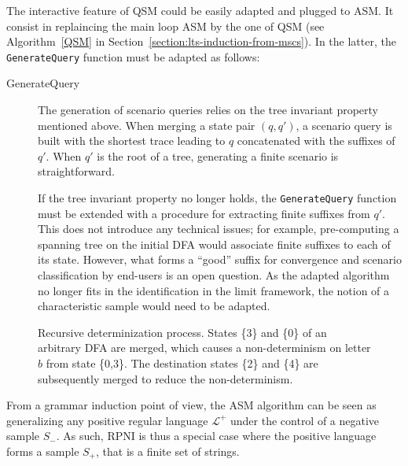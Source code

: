 The interactive feature of QSM could be easily adapted and plugged to ASM. It consist in replaincing the main loop ASM by the one of QSM (see Algorithm~\ref{QSM} in Section~\ref{section:lts-induction-from-mscs}). In the latter, the \texttt{GenerateQuery} function must be adapted as follows:

\begin{description}

\item[GenerateQuery] The generation of scenario queries relies on the tree invariant property mentioned above. When merging a state pair $(q,q')$, a scenario query is built with the shortest trace leading to $q$ concatenated with the suffixes of $q'$. When $q'$ is the root of a tree, generating a finite scenario is straightforward.

If the tree invariant property no longer holds, the \texttt{GenerateQuery} function must be extended with a procedure for extracting finite suffixes from $q'$. This does not introduce any technical issues; for example, pre-computing a spanning tree on the initial DFA would associate finite suffixes to each of its state. However, what forms a ``good'' suffix for convergence and scenario classification by end-users is an open question. As the adapted algorithm no longer fits in the identification in the limit framework, the notion of a characteristic sample would need to be adapted. 

\end{description}

\begin{figure}\centering
{}
\caption{Recursive determinization process. States \{3\} and \{0\} of an arbitrary DFA are merged, which causes a non-determinism on letter $b$ from state \{0,3\}. The destination states \{2\} and \{4\} are subsequently merged to reduce the non-determinism.\label{figure:merging-for-determ-on-dfa}} 
\end{figure}

From a grammar induction point of view, the ASM algorithm can be seen as generalizing any positive regular language $\mathcal{L}^+$ under the control of a negative sample $S_-$. As such, RPNI is thus a special case where the positive language forms a sample $S_+$, that is a finite set of strings.

